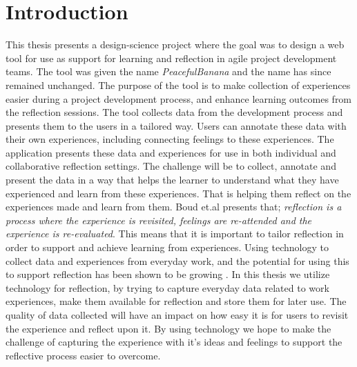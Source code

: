 \chapter{Introduction}
This thesis presents a design-science project where the goal was to design a web tool for use as support for learning and reflection in agile project development teams. The tool was given the name \emph{PeacefulBanana} and the name has since remained unchanged. The purpose of the tool is to make collection of experiences easier during a project development process, and enhance learning outcomes from the reflection sessions. 
The tool collects data from the development process and presents them to the users in a tailored way. Users can annotate these data with their own experiences, including connecting feelings to these experiences. The application presents these data and experiences for use in both individual and collaborative reflection settings. The challenge will be to collect, annotate and present the data in a way that helps the learner to understand what they have experienced and learn from these experiences. That is helping them reflect on the experiences made and learn from them. Boud et.al\citep{boudreflection1985} presents that; \emph{reflection is a process where the experience is revisited, feelings are re-attended and the experience is re-evaluated}. This means that it is important to tailor reflection in order to support and achieve learning from experiences. Using technology to collect data and experiences from everyday work, and the potential for using this to support reflection has been shown to be growing \citep{li2011understanding}. In this thesis we utilize technology for reflection, by trying to capture everyday data related to work experiences, make them available for reflection and store them for later use. The quality of data collected will have an impact on how easy it is for users to revisit the experience and reflect upon it. By using technology we hope to make the challenge of capturing the experience with it's ideas and feelings to support the reflective process easier to overcome. 

